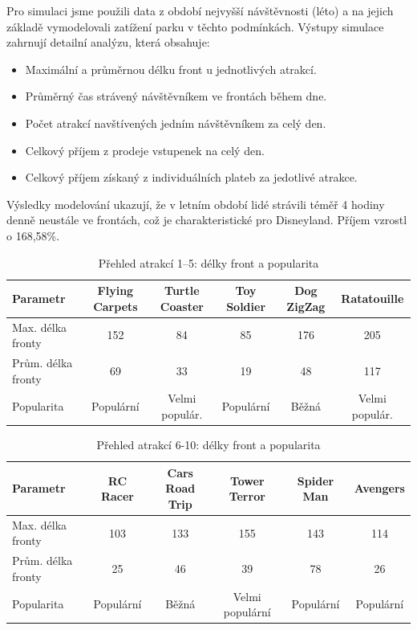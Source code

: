 \documentclass[a4paper,12pt]{article}
\begin{document}
Pro simulaci jsme použili data z období nejvyšší návštěvnosti (léto) a na jejich základě vymodelovali zatížení parku v těchto podmínkách. Výstupy simulace zahrnují detailní analýzu, která obsahuje:
\begin{itemize}
	\item Maximální a průměrnou délku front u jednotlivých atrakcí.
	\item Průměrný čas strávený návštěvníkem ve frontách během dne.
	\item Počet atrakcí navštívených jedním návštěvníkem za celý den.
	\item Celkový příjem z prodeje vstupenek na celý den.
	\item Celkový příjem získaný z individuálních plateb za jedotlivé atrakce.
\end{itemize}


Výsledky modelování ukazují, že v letním období lidé strávili téměř 4 hodiny denně neustále ve frontách, což je charakteristické pro Disneyland. Příjem vzrostl o 168,58\%.

\begin{table}[h!]
	\centering
	\caption{Přehled atrakcí 1–5: délky front a popularita}
	\label{tab:attractions_overview_1_5}
	\begin{tabular}{|l|c|c|c|c|c|}
		\hline
		\textbf{Parametr}&\textbf{Flying Carpets}&\textbf{Turtle Coaster}&\textbf{Toy Soldier}&\textbf{Dog ZigZag}&\textbf{Ratatouille}\\ \hline
		Max. délka fronty   &152                 & 84                 & 85                 & 176                 & 205      \\ \hline
		Prům. délka fronty  &69                 & 33                 & 19                 & 48                 & 117         \\ \hline
		Popularita          &Populární         &Velmi populár.        &Populární          & Běžná          &Velmi populár.\\ \hline
	\end{tabular}
\end{table}
\begin{table}[h!]
	\centering
	\caption{Přehled atrakcí 6-10: délky front a popularita}
	\label{tab:attractions_overview_6_10}
	\begin{tabular}{|l|c|c|c|c|c|}
		\hline
		\textbf{Parametr}   & \textbf{RC  Racer}& \textbf{Cars Road Trip}& \textbf{Tower Terror}& \textbf{Spider Man}& \textbf{Avengers}\\ \hline
		Max. délka fronty   & 103                 & 133                & 155                 & 143               & 114               \\ \hline
		Prům. délka fronty  & 25                & 46                 & 39                & 78                 & 26               \\ \hline
		Popularita          & Populární             & Běžná              & Velmi populární        & Populární          & Populární   \\ \hline
	\end{tabular}
\end{table}
\end{document}

